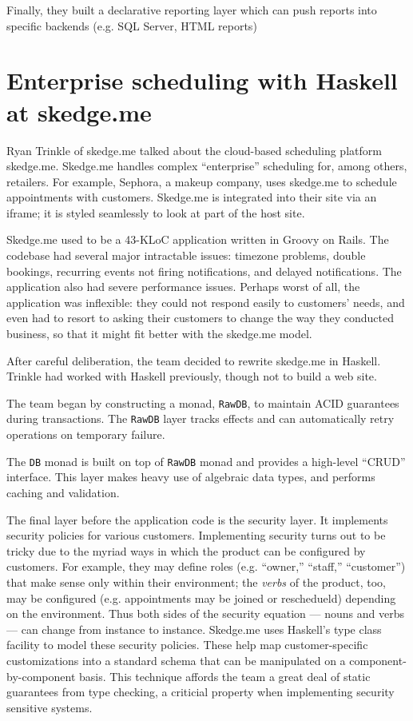 \documentclass{jfp1}
\begin{document}
Finally, they built a declarative reporting layer which can push reports
into specific backends (e.g. SQL Server, HTML reports)

\section{Enterprise scheduling with Haskell at skedge.me}


Ryan Trinkle of skedge.me talked about the cloud-based scheduling
platform skedge.me. Skedge.me handles complex ``enterprise''
scheduling for, among others, retailers. For example, Sephora, a
makeup company, uses skedge.me to schedule appointments with
customers. Skedge.me is integrated into their site via an iframe; it
is styled seamlessly to look at part of the host site.

Skedge.me used to be a 43-KLoC application written in Groovy on Rails.
The codebase had several major intractable issues: timezone problems,
double bookings, recurring events not firing notifications, and
delayed notifications. The application also had severe performance
issues. Perhaps worst of all, the application was inflexible: they
could not respond easily to customers' needs, and even had to resort to
asking their customers to change the way they conducted business, so
that it might fit better with the skedge.me model.

After careful deliberation, the team decided to rewrite skedge.me in 
Haskell. Trinkle had worked with Haskell previously, though not
to build a web site.

The team began by constructing a monad, \texttt{RawDB}, to maintain
ACID guarantees during transactions. The \texttt{RawDB} layer tracks
effects and can automatically retry operations on temporary failure.

The \texttt{DB} monad is built on top of \texttt{RawDB} monad and 
provides a high-level ``CRUD'' interface. This layer makes heavy 
use of algebraic data types, and performs caching and validation.

The final layer before the application code is the security layer. It
implements security policies for various customers. Implementing
security turns out to be tricky due to the myriad ways in which the
product can be configured by customers. For example, they may define
roles (e.g. ``owner,'' ``staff,'' ``customer'') that make sense only
within their environment; the \textit{verbs} of the product, too, may
be configured (e.g. appointments may be joined or reschedueld)
depending on the environment. Thus both sides of the security equation
--- nouns and verbs --- can change from instance to instance.
Skedge.me uses Haskell's type class facility to model these security
policies. These help map customer-specific customizations into a
standard schema that can be manipulated on a component-by-component
basis. This technique affords the team a great deal of static
guarantees from type checking, a criticial property when implementing
security sensitive systems.
\end{document}
